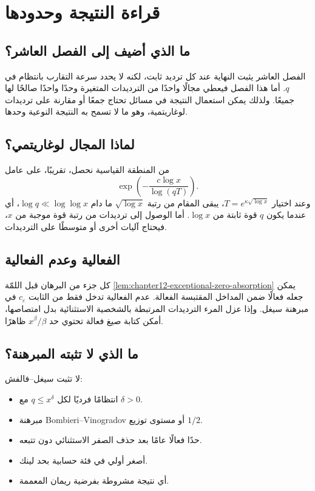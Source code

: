 \section{قراءة النتيجة وحدودها}

\subsection{ما الذي أضيف إلى الفصل العاشر؟}

الفصل العاشر يثبت النهاية عند كل ترديد ثابت، لكنه لا يحدد سرعة التقارب
بانتظام في \(q\). أما هذا الفصل فيعطي مجالًا واحدًا من الترديدات المتغيرة
وحدًا واحدًا صالحًا لها جميعًا. ولذلك يمكن استعمال النتيجة في مسائل تحتاج
جمعًا أو مقارنة على ترديدات لوغاريتمية، وهو ما لا تسمح به النتيجة النوعية
وحدها.

\subsection{لماذا المجال لوغاريتمي؟}

من المنطقة القياسية نحصل، تقريبًا، على عامل
\[
\exp\!\left(-\frac{c\log x}{\log(qT)}\right).
\]
وعند اختيار \(T=e^{\kappa\sqrt{\log x}}\)، يبقى المقام من رتبة
\(\sqrt{\log x}\) ما دام \(\log q\ll\log\log x\)، أي عندما يكون \(q\)
قوة ثابتة من \(\log x\). أما الوصول إلى ترديدات من رتبة قوة موجبة من
\(x\)، فيحتاج آليات أخرى أو متوسطًا على الترديدات.

\subsection{الفعالية وعدم الفعالية}

كل جزء من البرهان قبل اللمّة
\ref{lem:chapter12-exceptional-zero-absorption} يمكن جعله فعالًا ضمن
المداخل المقتبسة الفعالة. عدم الفعالية تدخل فقط من الثابت
\(c_\varepsilon\) في مبرهنة سيغل. وإذا عزل المرء الترديدات المرتبطة
بالشخصية الاستثنائية بدل امتصاصها، أمكن كتابة صيغ فعالة تحتوي حد
\(x^\beta/\beta\) ظاهرًا.

\subsection{ما الذي لا تثبته المبرهنة؟}

لا تثبت سيغل--فالفش:
\begin{itemize}
  \item انتظامًا فرديًا لكل \(q\le x^\delta\) مع \(\delta>0\).
  \item مبرهنة Bombieri--Vinogradov أو مستوى توزيع \(1/2\).
  \item حدًا فعالًا عامًا بعد حذف الصفر الاستثنائي دون تتبعه.
  \item أصغر أولي في فئة حسابية بحد لينك.
  \item أي نتيجة مشروطة بفرضية ريمان المعممة.
\end{itemize}

